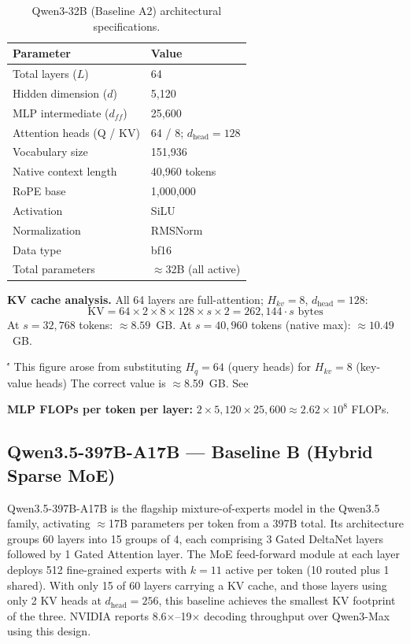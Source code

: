 \documentclass[11pt]{article}
\begin{document}
\begin{table}[ht]
\centering
\caption{Qwen3-32B (Baseline A2) architectural specifications.}
\label{tab:a2_specs}
\begin{tabular}{ll}
\toprule
\textbf{Parameter} & \textbf{Value} \\
\midrule
Total layers ($L$) & 64 \\
Hidden dimension ($d$) & 5,120 \\
MLP intermediate ($d_{ff}$) & 25,600 \\
Attention heads (Q / KV) & 64 / 8; $d_{\text{head}} = 128$ \\
Vocabulary size & 151,936 \\
Native context length & 40,960 tokens \\
RoPE base & 1,000,000 \\
Activation & SiLU \\
Normalization & RMSNorm \\
Data type & bf16 \\
Total parameters & $\approx$32B (all active) \\
\bottomrule
\end{tabular}
\end{table}

\textbf{KV cache analysis.}
All 64 layers are full-attention; $H_{kv} = 8$, $d_{\text{head}} = 128$:
\[
\text{KV} = 64 \times 2 \times 8 \times 128 \times s \times 2 = 262{,}144 \cdot s \text{ bytes}
\]
At $s = 32{,}768$ tokens: $\approx 8.59$~GB.
At $s = 40{,}960$ tokens (native max): $\approx 10.49$~GB.

\''
This figure arose from substituting $H_q = 64$ (query heads) for $H_{kv} = 8$ (key-value heads)
The correct value is $\approx$8.59~GB.
See 

\textbf{MLP FLOPs per token per layer:}
$2 \times 5{,}120 \times 25{,}600 \approx 2.62 \times 10^{8}$ FLOPs.

\subsection{Qwen3.5-397B-A17B --- Baseline B (Hybrid Sparse MoE)}
\label{sec:baseline_b}

Qwen3.5-397B-A17B is the flagship mixture-of-experts model in the Qwen3.5 family, activating $\approx$17B parameters per token from a 397B total.
Its architecture groups 60 layers into 15 groups of 4, each comprising 3 Gated DeltaNet layers followed by 1 Gated Attention layer.
The MoE feed-forward module at each layer deploys 512 fine-grained experts with $k{=}11$ active per token (10 routed plus 1 shared).
With only 15 of 60 layers carrying a KV cache, and those layers using only 2 KV heads at $d_{\text{head}} = 256$, this baseline achieves the smallest KV footprint of the three.
NVIDIA reports 8.6$\times$--19$\times$ decoding throughput over Qwen3-Max using this design.
\end{document}
